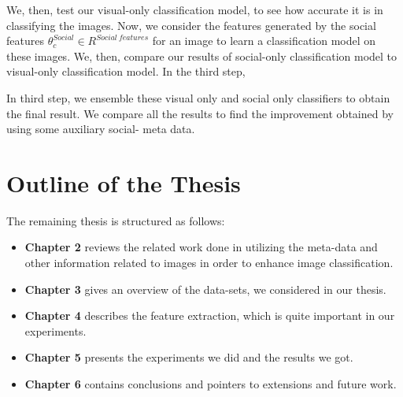 	   We, then, test our visual-only classification model, to see how 
accurate it is in classifying the images. Now, we consider the  
features generated by the social features 
$\theta_c ^{Social} \in R^{Social\ features}$ for an image to  learn 
a classification model on these images.  We, then, compare our 
results of social-only classification model to visual-only 
classification model. In the third step, 
	   
	   In third step, we ensemble these visual only and social only 
classifiers to obtain the final result. We compare all the results 
to find the improvement obtained by using some auxiliary social-
meta data.

\section{Outline of the Thesis}
The remaining thesis is structured as follows:
\begin{itemize}
\item{{\bf Chapter 2} reviews the related work done in utilizing the meta-data and other information related to images in order to enhance image classification.}
\item{{\bf Chapter 3} gives an overview of the data-sets, we considered in our thesis. }
\item{{\bf Chapter 4} describes the feature extraction, which is quite important in our experiments.}
\item{{\bf Chapter 5} presents the experiments we did and the results we got. }
\item{{\bf Chapter 6} contains conclusions and pointers to extensions and future work. }
\end{itemize}

